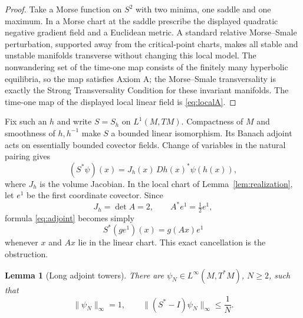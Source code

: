 \documentclass[11pt]{article}
\newtheorem{lemma}[theorem]{Lemma}
\begin{document}
\begin{proof}
Take a Morse function on $S^2$ with two minima, one saddle and one maximum.
In a Morse chart at the saddle prescribe the displayed quadratic negative
gradient field and a Euclidean metric.  A standard relative Morse--Smale
perturbation, supported away from the critical-point charts, makes all stable
and unstable manifolds transverse without changing this local model.  The
nonwandering set of the time-one map consists of the finitely many hyperbolic
equilibria, so the map satisfies Axiom A; the Morse--Smale transversality is
exactly the Strong Transversality Condition for these invariant manifolds.
The time-one map of the displayed local linear field is \eqref{eq:localA}.
\end{proof}

Fix such an $h$ and write $S=S_h$ on $L^1(M,TM)$.  Compactness of $M$ and
smoothness of $h,h^{-1}$ make $S$ a bounded linear isomorphism.  Its Banach
adjoint acts on essentially bounded covector fields.  Change of variables in
the natural pairing gives
\begin{equation}
  (S^*\psi)(x)=J_h(x)\,Dh(x)^*\psi(h(x)),
  \label{eq:adjoint}
\end{equation}
where $J_h$ is the volume Jacobian.  In the local chart of
Lemma~\ref{lem:realization}, let $e^1$ be the first coordinate covector.  Since
\[
 J_h=\det A=2,\qquad A^*e^1=\tfrac12e^1,
\]
formula \eqref{eq:adjoint} becomes simply
\begin{equation}
 S^*(g e^1)(x)=g(Ax)e^1
 \label{eq:neutral}
\end{equation}
whenever $x$ and $Ax$ lie in the linear chart.  This exact cancellation is
the obstruction.

\begin{lemma}[Long adjoint towers]\label{lem:towers}
There are $\psi_N\in L^\infty(M,T^*M)$, $N\geq2$, such that
\begin{equation}
 \|\psi_N\|_\infty=1,
 \qquad
 \|(S^*-I)\psi_N\|_\infty\leq\frac1N.
 \label{eq:tower-estimate}
\end{equation}
\end{lemma}
\end{document}
